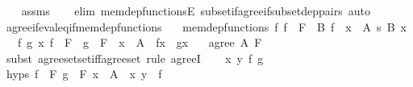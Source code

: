 \begin{isabellebody}
%
\isadelimproof
\ \ %
\endisadelimproof
%
\isatagproof
{}\isamarkupfalse%
\ assms\isanewline
\ \ \isamarkupfalse%
\ {\isacharparenleft}{\kern0pt}elim\ mem{\isacharunderscore}{\kern0pt}dep{\isacharunderscore}{\kern0pt}functionsE\ subset{\isacharunderscore}{\kern0pt}if{\isacharunderscore}{\kern0pt}agree{\isacharunderscore}{\kern0pt}if{\isacharunderscore}{\kern0pt}subset{\isacharunderscore}{\kern0pt}dep{\isacharunderscore}{\kern0pt}pairs{\isacharparenright}{\kern0pt}\ auto%
\endisatagproof
{\isafoldproof}%
%
\isadelimproof
\isanewline
%
\endisadelimproof
\isanewline
{}\isamarkupfalse%
\ agree{\isacharunderscore}{\kern0pt}if{\isacharunderscore}{\kern0pt}eval{\isacharunderscore}{\kern0pt}eq{\isacharunderscore}{\kern0pt}if{\isacharunderscore}{\kern0pt}mem{\isacharunderscore}{\kern0pt}dep{\isacharunderscore}{\kern0pt}functions{\isacharcolon}{\kern0pt}\isanewline
\ \ \ mem{\isacharunderscore}{\kern0pt}dep{\isacharunderscore}{\kern0pt}functions{\isacharcolon}{\kern0pt}\ {\isachardoublequoteopen}{\isasymAnd}f{\isachardot}{\kern0pt}\ f\ {\isasymin}\ F\ {\isasymLongrightarrow}\ {\isasymexists}B{\isachardot}{\kern0pt}\ f\ {\isasymin}\ {\isacharparenleft}{\kern0pt}x\ {\isasymin}\ A{\isacharparenright}{\kern0pt}\ {\isasymrightarrow}s\ {\isacharparenleft}{\kern0pt}B\ x{\isacharparenright}{\kern0pt}{\isachardoublequoteclose}\isanewline
\ \ \ {\isachardoublequoteopen}{\isasymAnd}f\ g\ x{\isachardot}{\kern0pt}\ f\ {\isasymin}\ F\ {\isasymLongrightarrow}\ g\ {\isasymin}\ F\ {\isasymLongrightarrow}\ x\ {\isasymin}\ A\ {\isasymLongrightarrow}\ f{\isacharbackquote}{\kern0pt}x\ {\isacharequal}{\kern0pt}\ g{\isacharbackquote}{\kern0pt}x{\isachardoublequoteclose}\isanewline
\ \ \ {\isachardoublequoteopen}agree\ A\ F{\isachardoublequoteclose}\isanewline
%
\isadelimproof
%
\endisadelimproof
%
\isatagproof
{}\isamarkupfalse%
\ {\isacharparenleft}{\kern0pt}subst\ agree{\isacharunderscore}{\kern0pt}set{\isacharunderscore}{\kern0pt}set{\isacharunderscore}{\kern0pt}iff{\isacharunderscore}{\kern0pt}agree{\isacharunderscore}{\kern0pt}set{\isacharcomma}{\kern0pt}\ rule\ agreeI{\isacharparenright}{\kern0pt}\isanewline
\ \ \isamarkupfalse%
\ x\ y\ f\ g\ \isamarkupfalse%
\ hyps{\isacharcolon}{\kern0pt}\ {\isachardoublequoteopen}f\ {\isasymin}\ F{\isachardoublequoteclose}\ {\isachardoublequoteopen}g\ {\isasymin}\ F{\isachardoublequoteclose}\ {\isachardoublequoteopen}x\ {\isasymin}\ A{\isachardoublequoteclose}\ \ {\isachardoublequoteopen}{\isasymlangle}x{\isacharcomma}{\kern0pt}\ y{\isasymrangle}\ {\isasymin}\ f{\isachardoublequoteclose}\isanewline

\end{isabellebody}
